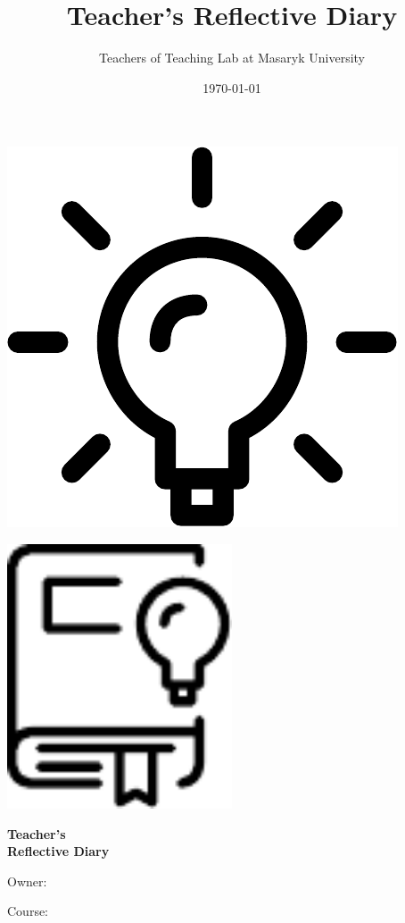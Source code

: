 \documentclass[twoside,openany]{book}
\title{Teacher's Reflective Diary}
\author{Teachers of Teaching Lab at Masaryk University}
\date{\today}
\begin{document}
\begin{titlepage}
	\vspace*{0.14\paperheight}
	\centering
	\includegraphics[width=0.7\paperwidth]{../img/lightbulb}
	\newpage
\end{titlepage}
\begin{titlepage}
	\centering
	\vspace*{1cm}
	\includegraphics[width=0.5\textwidth]{../img/diary}\par
	\vspace{0.5cm}
	{\huge\bfseries Teacher's\\ Reflective Diary\par}
	\vfill
	\raggedright
	\Large
	Owner:\par
	\vspace{0.2cm}
	Course:\par
\end{titlepage}
\end{document}
